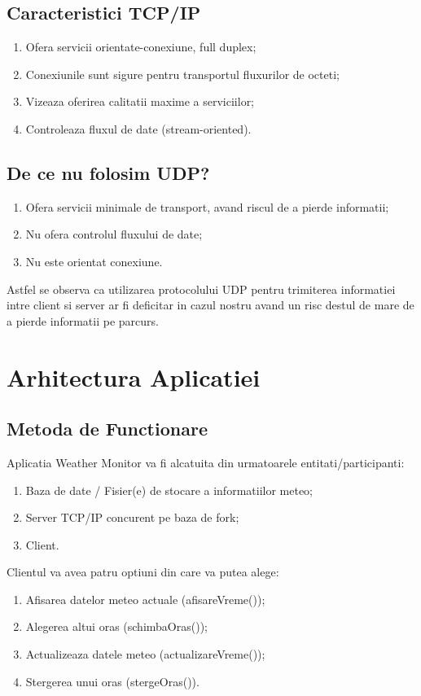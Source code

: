 \documentclass{llncs}
\begin{document}
\subsection{Caracteristici TCP/IP}
%
\begin{enumerate}
%
\item Ofera servicii orientate-conexiune, full duplex;
\item Conexiunile sunt sigure pentru transportul fluxurilor de octeti;
\item Vizeaza oferirea calitatii maxime a serviciilor;
\item Controleaza fluxul de date (stream-oriented).
\end{enumerate}
%
\subsection{De ce nu folosim UDP?}
%
\begin{enumerate}
\item Ofera servicii minimale de transport, avand riscul de a pierde informatii;
\item Nu ofera controlul fluxului de date;
\item Nu este orientat conexiune.
\end{enumerate}
%
Astfel se observa ca utilizarea protocolului UDP pentru trimiterea informatiei intre client si server ar fi deficitar in cazul nostru avand un risc destul de mare de a pierde informatii pe parcurs.
%
\section{Arhitectura Aplicatiei}
%
\subsection{Metoda de Functionare}
%
Aplicatia Weather Monitor va fi alcatuita din urmatoarele entitati/participanti:
%
\begin{enumerate}
\item Baza de date / Fisier(e) de stocare a informatiilor meteo;
\item Server TCP/IP concurent pe baza de fork;
\item Client.
\end{enumerate}
%
Clientul va avea patru optiuni din care va putea alege:
%
\begin{enumerate}
\item Afisarea datelor meteo actuale (afisareVreme());
\item Alegerea altui oras (schimbaOras());
\item Actualizeaza datele meteo (actualizareVreme());
\item Stergerea unui oras (stergeOras()).
\end{enumerate}
%
\end{document}

